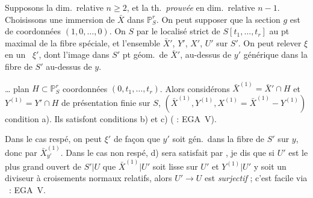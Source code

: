 \documentclass[11pt,a4paper]{article}
\begin{document}
Supposons la dim.\ relative $n \geqslant 2$, et la th.\ \emph{prouvée} en dim.\ relative $n-1$. Choisissons une immersion de $\bar X$ dans $\mathbb{P}^r_S$.  On peut supposer \struck{\ill{}} que la section $g$ est de coordonnées $(1, 0, \ldots, 0)$. On  \struck{\ill{}} $S$ par le localisé strict de $S[t_1, \ldots, t_r]$ au pt maximal de la fibre spéciale, et l'ensemble   \struck{\ill{}} $\bar X'$, $Y'$, $X'$, $U'$ sur $S'$. On peut relever $\xi$ en un \struck{\ill{}}  \ $\xi'$, dont l'image dans $S'$ \struck{\ill{}} pt géom.\ de $\bar X'$, \struck{\ill{}}  \struck{\ill{}} au-dessus de $y'$ générique dans la fibre de $S'$ au-dessus de $y$.   \struck{\ill{} \ill{} \ill{} \ill{} \ill{}}

… plan $H \subset \mathbb{P}^r_S$  coordonnées $(0, t_1, \ldots, t_r)$.  \struck{\ill{}}   Alors   considérons $\bar X^{(1)} = \bar X' \cap H$ et $Y^{(1)} = Y' \cap H$   de présentation finie sur $S$,   $(\bar X^{(1)}, Y^{(1)}, X^{(1)} = \bar X^{(1)} - Y^{(1)})$  \struck{\ill{}}   condition a). Ils satisfont   conditions b) et c) (\struck{\ill{}}  : EGA~V).

Dans le cas \struck{\ill{}} respé, on peut  $\xi'$ de façon que $y'$ soit gén.\ dans la fibre de $S'$ sur $y$, donc \uncertain{\ill{}} par $\bar X^{(1)}_{y'}$. Dans le cas non respé, d) sera satisfait par \ill{} \struck{\ill{}} , je dis que si $U'$ est le plus grand ouvert de $S'|U$   que $\bar X^{(1)}|U'$ soit lisse sur $U'$ et $Y^{(1)}|U'$ y soit un diviseur à croisements normaux relatifs, alors $U' \to U$ est \emph{surjectif} ; \struck{\ill{}} c'est  facile via \ : EGA~V.
\end{document}
